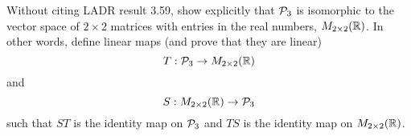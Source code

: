 \begin{question}
\normalfont
\noindent Without citing LADR result 3.59, show explicitly that  $\P_3$ is isomorphic to the vector space of $2\times2$ matrices with entries in the real numbers, $M_{2\times 2}(\real)$. In other words, define linear maps (and prove that they are linear)
\[
T: \P_3 \to M_{2\times2}(\real)
\]
and 
\[
S: M_{2\times2}(\real) \to \P_3
\]
such that $ST$ is the identity map on $\P_3$ and $TS$ is the identity map on $M_{2\times2}(\real)$.  \\ 


\end{question}